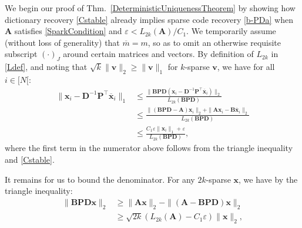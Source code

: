 \documentclass[journal, twocolumn]{IEEEtran}
\begin{document}
We begin our proof of Thm.~\ref{DeterministicUniquenessTheorem} by showing how dictionary recovery \eqref{Cstable} already implies sparse code recovery \eqref{b-PDa} when $\mathbf{A}$ satisfies \eqref{SparkCondition} and \mbox{$\varepsilon < L_{2k}(\mathbf{A}) / C_1$}. We temporarily assume (without loss of generality) that $\overline m = m$, so as to omit an otherwise requisite subscript $(\cdot)_J$ around certain matrices and vectors. By definition of $L_{2k}$ in \eqref{Ldef}, and noting that $\sqrt{k} \|\mathbf{v}\|_2 \geq \|\mathbf{v}\|_1$ for $k$-sparse $\mathbf{v}$, we have for all $i \in [N[$:
\begin{align}\label{stuff}
\|\mathbf{x}_i - \mathbf{D}^{-1}\mathbf{P}^{\top}\mathbf{\overline x}_i \|_1 \nonumber
&\leq \frac{\|\mathbf{BPD}(\mathbf{x}_i - \mathbf{D}^{-1}\mathbf{P}^{\top}\mathbf{\overline x}_i)\|_2}{L_{2k}(\mathbf{BPD})} \\ \nonumber
&\leq \frac{\|( \mathbf{BPD} - \mathbf{A}) \mathbf{x}_i\|_2 + \|\mathbf{A}\mathbf{x}_i - \mathbf{B}\mathbf{\overline x}_i\|_2}{L_{2k}(\mathbf{BPD})} \\
&\leq \frac{C_1\varepsilon \|\mathbf{x}_i\|_1 + \varepsilon}{L_{2k}(\mathbf{BPD})},
\end{align}
where the first term in the numerator above follows from the triangle inequality and \eqref{Cstable}.

It remains for us to bound the denominator. For any $2k$-sparse $\mathbf{x}$, we have by the triangle inequality:
\begin{align*}
\|\mathbf{BPD}\mathbf{x}\|_2 
&\geq \|\mathbf{A}\mathbf{x}\|_2 - \|(\mathbf{A} - \mathbf{BPD})\mathbf{x}\|_2 \\
&\geq \sqrt{2k} (L_{2k}(\mathbf{A}) -  C_1\varepsilon) \|\mathbf{x}\|_2,
\end{align*}
\end{document}
